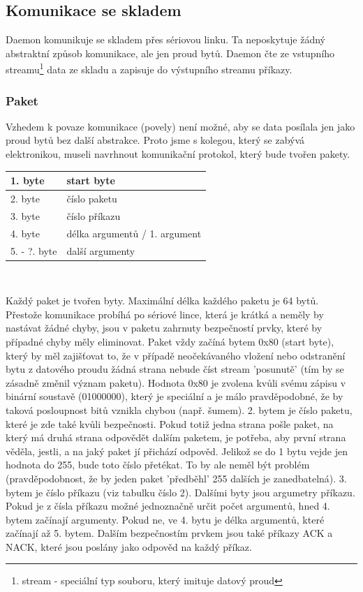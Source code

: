 \documentclass[12pt, a4paper, oneside]{article}
\begin{document}
\subsection {Komunikace se skladem}

Daemon komunikuje se skladem přes sériovou linku. Ta neposkytuje žádný abstraktní způsob komunikace, ale jen proud bytů. Daemon čte ze vstupního streamu\footnote{stream - speciální typ souboru, který imituje datový proud} data ze skladu a zapisuje do výstupního streamu příkazy.

\subsubsection{Paket}

Vzhedem k povaze komunikace (povely) není možné, aby se data posílala jen jako proud bytů bez další abstrakce. Proto jsme s kolegou, který se zabývá elektronikou, museli navrhnout komunikační protokol, který bude tvořen pakety.

\vspace{3mm}
\begin{center}
\begin{tabular}{| l | l |}
\hline
1. byte & start byte \\ \hline
2. byte & číslo paketu \\ \hline
3. byte & číslo příkazu \\ \hline
4. byte & délka argumentů / 1. argument \\ \hline
5. - ?. byte & další argumenty \\ \hline
\end {tabular}
\\
\vspace{1mm}
\caption{Tabulka 1: Popis paketu}
\end{center}


Každý paket je tvořen byty. Maximální délka každého paketu je 64 bytů.
Přestože komunikace probíhá po sériové lince, která je krátká a neměly by nastávat žádné chyby, jsou v paketu zahrnuty bezpečností prvky, které by případné chyby měly eliminovat.
Paket vždy začíná bytem 0x80 (start byte), který by měl zajišťovat to, že v případě neočekávaného vložení nebo odstranění bytu z datového proudu žádná strana nebude číst stream 'posunutě' (tím by se zásadně změnil význam paketu). Hodnota 0x80 je zvolena kvůli svému zápisu v binární soustavě (01000000), který je speciální a je málo pravděpodobné, že by taková posloupnost bitů vznikla chybou (např. šumem).
2. bytem je číslo paketu, které je zde také kvůli bezpečnosti. Pokud totiž jedna strana pošle paket, na který má druhá strana odpovědět dalším paketem, je potřeba, aby první strana věděla, jestli, a na jaký paket jí přichází odpověd. Jelikož se do 1 bytu vejde jen hodnota do 255, bude toto číslo přetékat. To by ale neměl být problém (pravděpodobnost, že by jeden paket 'předběhl' 255 dalších je zanedbatelná).
3. bytem je číslo příkazu (viz tabulku číslo 2).
Dalšími byty jsou argumetry příkazu. Pokud je z čísla příkazu možné jednoznačně určit počet argumentů, hned 4. bytem začínají argumenty. Pokud ne, ve 4. bytu je délka argumentů, které začínají až 5. bytem.
Dalším bezpečnostím prvkem jsou také příkazy ACK a NACK, které jsou poslány jako odpověd na každý příkaz.
\end{document}
